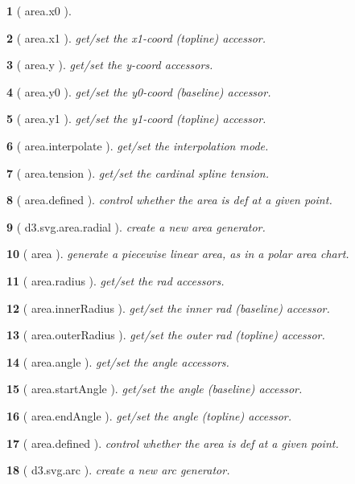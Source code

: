\documentclass[10pt,landscape,letterpaper]{article}
\newcounter{thm}
\theoremstyle{mytheoremstyle}
\newtheorem*{thm}{}
\begin{document}
\begin{multicols}{3}
\begin{thm} [ area.x0 ]
\end{thm}\begin{thm} [ area.x1 ]  get/set the x1-coord (topline) accessor.
\end{thm}\begin{thm} [ area.y ]  get/set the y-coord accessors.
\end{thm}\begin{thm} [ area.y0 ]  get/set the y0-coord (baseline) accessor.
\end{thm}\begin{thm} [ area.y1 ]  get/set the y1-coord (topline) accessor.
\end{thm}\begin{thm} [ area.interpolate ]  get/set the interpolation mode.
\end{thm}\begin{thm} [ area.tension ]  get/set the cardinal spline tension.
\end{thm}\begin{thm} [ area.defined ]  control whether the area is def at a given point.
\end{thm}\begin{thm} [ d3.svg.area.radial ]  create a new area generator.
\end{thm}\begin{thm} [ area ]  generate a piecewise linear area, as in a polar area chart.
\end{thm}\begin{thm} [ area.radius ]  get/set the rad accessors.
\end{thm}\begin{thm} [ area.innerRadius ]  get/set the inner rad (baseline) accessor.
\end{thm}\begin{thm} [ area.outerRadius ]  get/set the outer rad (topline) accessor.
\end{thm}\begin{thm} [ area.angle ]  get/set the angle accessors.
\end{thm}\begin{thm} [ area.startAngle ]  get/set the angle (baseline) accessor.
\end{thm}\begin{thm} [ area.endAngle ]  get/set the angle (topline) accessor.
\end{thm}\begin{thm} [ area.defined ]  control whether the area is def at a given point.
\end{thm}\begin{thm} [ d3.svg.arc ]  create a new arc generator.

\end{thm}
\end{multicols}
\end{document}
